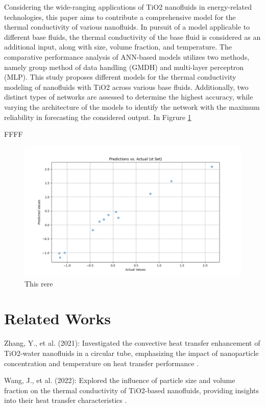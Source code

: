 \documentclass{article}
\begin{document}
Considering the wide-ranging applications of TiO2 nanofluids in energy-related technologies, this paper aims to contribute a comprehensive model for the thermal conductivity of various nanofluids. In pursuit of a model applicable to different base fluids, the thermal conductivity of the base fluid is considered as an additional input, along with size, volume fraction, and temperature. The comparative performance analysis of ANN-based models utilizes two methods, namely group method of data handling (GMDH) and multi-layer perceptron (MLP). This study proposes different models for the thermal conductivity modeling of nanofluids with TiO2 across various base fluids. Additionally, two distinct types of networks are assessed to determine the highest accuracy, while varying the architecture of the models to identify the network with the maximum reliability in forecasting the considered output. In Figrure \ref{fig:scatterplot}


FFFF
\begin{figure}[H]
	\centering
	\includegraphics[width=\textwidth]{pics/scatter_plot}
	\caption{This rere}
	\label{fig:scatterplot}
\end{figure}




\section{Related Works}

Zhang, Y., et al. (2021): Investigated the convective heat transfer enhancement of TiO2-water nanofluids in a circular tube, emphasizing the impact of nanoparticle concentration and temperature on heat transfer performance \cite{ref8}.

Wang, J., et al. (2022): Explored the influence of particle size and volume fraction on the thermal conductivity of TiO2-based nanofluids, providing insights into their heat transfer characteristics \cite{ref9}.
\end{document}

